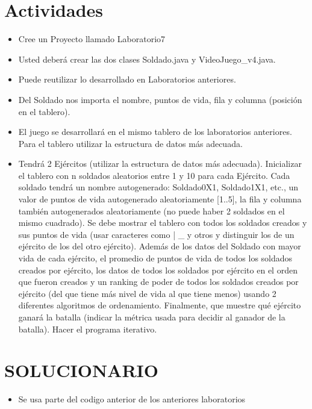 \documentclass{article}
\begin{document}
	\section{Actividades}
	\begin{itemize}		
		\item Cree un Proyecto llamado Laboratorio7
		\item Usted deberá crear las dos clases Soldado.java y VideoJuego_v4.java. 
		\item Puede reutilizar lo desarrollado en Laboratorios anteriores.
		\item Del Soldado nos importa el nombre, puntos de vida, fila y columna (posición en el tablero).
		
\item El juego se desarrollará en el mismo tablero de los laboratorios anteriores. Para el tablero
utilizar la estructura de datos más adecuada.
\item Tendrá 2 Ejércitos (utilizar la estructura de datos más adecuada). Inicializar el tablero con n
soldados aleatorios entre 1 y 10 para cada Ejército. Cada soldado tendrá un nombre
autogenerado: Soldado0X1, Soldado1X1, etc., un valor de puntos de vida autogenerado
aleatoriamente [1..5], la fila y columna también autogenerados aleatoriamente (no puede
haber 2 soldados en el mismo cuadrado). Se debe mostrar el tablero con todos los soldados
creados y sus puntos de vida (usar caracteres como | _ y otros y distinguir los de un ejército
de los del otro ejército). Además de los datos del Soldado con mayor vida de cada ejército, el
promedio de puntos de vida de todos los soldados creados por ejército, los datos de todos los
soldados por ejército en el orden que fueron creados y un ranking de poder de todos los
soldados creados por ejército (del que tiene más nivel de vida al que tiene menos) usando 2 diferentes algoritmos de ordenamiento. Finalmente, que muestre qué ejército ganará la
batalla (indicar la métrica usada para decidir al ganador de la batalla). Hacer el programa
iterativo.

	
	\end{itemize}
		
	\section{SOLUCIONARIO}
	\begin{itemize}
		\item Se usa parte del codigo anterior de los anteriores laboratorios
	\end{itemize}
\end{document}
